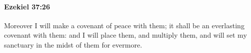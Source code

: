 
		\paragraph{Ezekiel 37:26} %
			\label{EZEKIEL-37-26}

			Moreover I will make a covenant of peace with them; it shall be an everlasting covenant with them: and I will place them, and multiply them, and will set my sanctuary in the midst of them for evermore.


